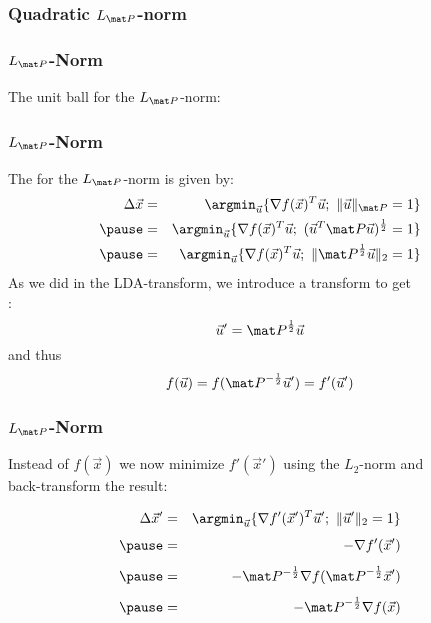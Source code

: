 \subsubsection{Quadratic $L_{\mat P}$-norm}

\begin{frame}
  \frametitle{$L_{\mat P}$-Norm}
  
  The unit ball for the $L_{\mat P}$-norm:

  \begin{figure}
  \end{figure}
\end{frame}


\begin{frame}
  \frametitle{$L_{\mat P}$-Norm \cont}
  
  The  for the $L_{\mat P}$-norm is given by:
%  
  \begin{eqnarray*}
    \Delta \vec x 
      &=& \argmin_{\vec u} \{\nabla f(\vec x)^T \vec u ; \ \| \vec u\|_{\mat P} = 1\} \\ \pause
      &=& \argmin_{\vec u} \{\nabla f(\vec x)^T \vec u ;\  (\vec u^T{\mat P}\vec u)^{\frac{1}{2}} = 1\} \\ \pause
      &=& \argmin_{\vec u} \{\nabla f(\vec x)^T \vec u ;\ \| {\mat P}^{\frac{1}{2}} \vec u\|_2 = 1\}
  \end{eqnarray*}
  \pause
%  
  As we did in the LDA-transform, we introduce a transform to get \\
  :
%
  \begin{displaymath}
    \vec u' = {\mat P}^{\frac{1}{2}} \vec u
  \end{displaymath}
  \pause
%
  and thus
%  
  \begin{displaymath}
    f(\vec u) = f({\mat P}^{-\frac{1}{2}}\vec u') = f'(\vec u')
  \end{displaymath}
\end{frame}


\begin{frame}
  \frametitle{$L_{\mat P}$-Norm \cont}
  
  Instead of $f(\vec x)$ we now minimize $f'(\vec x')$ using the $L_2$-norm and \\
  back-transform the result:
  
  \begin{eqnarray*}
    \Delta \vec x' 
      &=& \argmin_{\vec u} \{\nabla f'(\vec x')^T \vec u' ; \ \| \vec u'\|_{2} = 1\} \\[.15cm] \pause
      &=& -\nabla f'(\vec x') \\[.15cm] \pause
      &=& -\mat P^{-\frac{1}{2}}\nabla f({\mat P}^{-\frac{1}{2}}\vec x') \\[.15cm] \pause
      &=& - {\mat P}^{-\frac{1}{2}}\nabla f(\vec x)
  \end{eqnarray*}
\end{frame}


